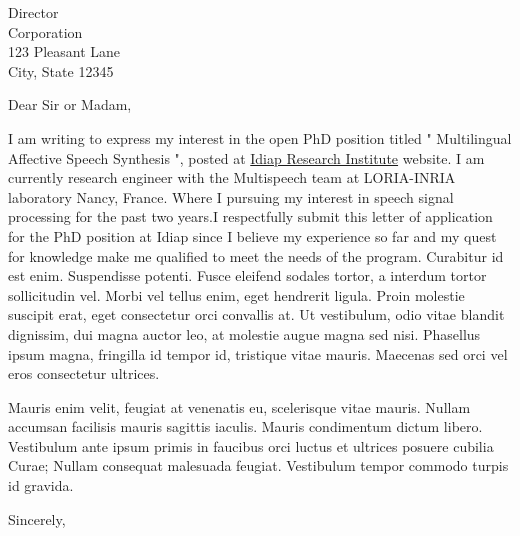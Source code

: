\documentclass[
	pagenumber=false, %
	parskip=half, %
	fromalign=right, %
	foldmarks=true, %
	addrfield=true %
	]{scrlttr2}
\date{\today} %
\begin{document}
 
\begin{letter}{Director \\ Corporation \\ 123 Pleasant Lane \\ City, State 12345} %


\opening{Dear Sir or Madam,}


		I am writing to express my interest in the open PhD position titled " Multilingual Affective Speech Synthesis ", posted at \href{https://www.idiap.ch/education-and-jobs}{Idiap Research Institute} website. I am currently research engineer with the Multispeech team at LORIA-INRIA laboratory Nancy, France. Where I pursuing my interest in speech signal processing for the past two years.I respectfully submit this letter of application for the PhD position at 
Idiap since I believe my experience so far and my quest for knowledge 
make me qualified to meet the needs of the program. 
Curabitur id est enim. Suspendisse potenti. Fusce eleifend sodales tortor, a interdum tortor sollicitudin vel. Morbi vel tellus enim, eget hendrerit ligula. Proin molestie suscipit erat, eget consectetur orci convallis at. Ut vestibulum, odio vitae blandit dignissim, dui magna auctor leo, at molestie augue magna sed nisi. Phasellus ipsum magna, fringilla id tempor id, tristique vitae mauris. Maecenas sed orci vel eros consectetur ultrices.

Mauris enim velit, feugiat at venenatis eu, scelerisque vitae mauris. Nullam accumsan facilisis mauris sagittis iaculis. Mauris condimentum dictum libero. Vestibulum ante ipsum primis in faucibus orci luctus et ultrices posuere cubilia Curae; Nullam consequat malesuada feugiat. Vestibulum tempor commodo turpis id gravida.

\closing{Sincerely,}



\end{letter}
 
\end{document}
